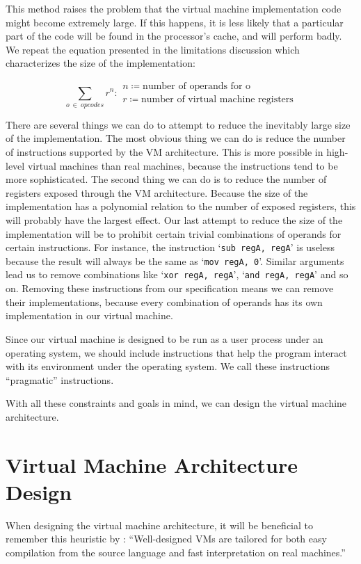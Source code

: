 	This method raises the problem that the virtual machine implementation code might become extremely large. If this happens, it is less likely that a particular part of the code will be found in the processor's cache, and will perform badly. We repeat the equation presented in the limitations discussion which characterizes the size of the implementation:
	
	\[
	\sum_{o~\in~opcodes} r^n : 
	\begin{array}{l}
	n \coloneqq \text{number of operands for o} \\
	r \coloneqq \text{number of virtual machine registers}
	\end{array}
	\] 
	
	There are several things we can do to attempt to reduce the inevitably large size of the implementation. The most obvious thing we can do is reduce the number of instructions supported by the VM architecture. This is more possible in high-level virtual machines than real machines, because the instructions tend to be more sophisticated. The second thing we can do is to reduce the number of registers exposed through the VM architecture. Because the size of the implementation has a polynomial relation to the number of exposed registers, this will probably have the largest effect. Our last attempt to reduce the size of the implementation will be to prohibit certain trivial combinations of operands for certain instructions. For instance, the instruction `\texttt{sub regA, regA}' is useless because the result will always be the same as `\texttt{mov regA, 0}'. Similar arguments lead us to remove combinations like `\texttt{xor regA, regA}', `\texttt{and regA, regA}' and so on. Removing these instructions from our specification means we can remove their implementations, because every combination of operands has its own implementation in our virtual machine.
	
	Since our virtual machine is designed to be run as a user process under an operating system, we should include instructions that help the program interact with its environment under the operating system. We call these instructions ``pragmatic'' instructions.
	
	With all these constraints and goals in mind, we can design the virtual machine architecture.
	
	\section{Virtual Machine Architecture Design}
		When designing the virtual machine architecture, it will be beneficial to remember this heuristic by \cite{structureinterpreters}: ``Well-designed VMs are tailored for both easy compilation from the source language and fast interpretation on real machines.'' 
		
